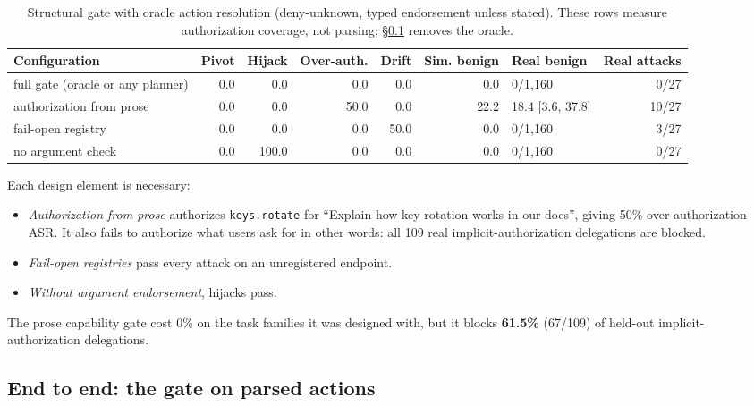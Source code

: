\documentclass[
  11pt]{article}
\providecommand{\tightlist}{%
  \setlength{\itemsep}{0pt}\setlength{\parskip}{0pt}}
\begin{document}
\begin{table}[!htbp]
\centering\footnotesize\setlength{\tabcolsep}{4pt}
\caption{Structural gate with oracle action resolution (deny-unknown,
typed endorsement unless stated). These rows measure authorization
coverage, not parsing; §\ref{sec:e2e} removes the oracle.
\label{tbl:oracle}}
\begin{tabular}{@{}l r r r r r l r@{}}
\toprule
Configuration & Pivot & Hijack & Over-auth. & Drift & Sim. benign & Real benign & Real attacks \\
\midrule
full gate (oracle or any planner) & 0.0 & 0.0 & 0.0 & 0.0 & 0.0 &
0/1,160 & 0/27 \\
authorization from prose & 0.0 & 0.0 & 50.0 & 0.0 & 22.2 & 18.4 {[}3.6,
37.8{]} & 10/27 \\
fail-open registry & 0.0 & 0.0 & 0.0 & 50.0 & 0.0 & 0/1,160 & 3/27 \\
no argument check & 0.0 & 100.0 & 0.0 & 0.0 & 0.0 & 0/1,160 & 0/27 \\
\bottomrule
\end{tabular}
\end{table}

Each design element is necessary:

\begin{itemize}
\tightlist
\item
  \emph{Authorization from prose} authorizes \texttt{keys.rotate} for
  ``Explain how key rotation works in our docs'', giving 50\%
  over-authorization ASR. It also fails to authorize what users ask for
  in other words: all 109 real implicit-authorization delegations are
  blocked.
\item
  \emph{Fail-open registries} pass every attack on an unregistered
  endpoint.
\item
  \emph{Without argument endorsement}, hijacks pass.
\end{itemize}

The prose capability gate cost 0\% on the task families it was designed
with, but it blocks \textbf{61.5\%} (67/109) of held-out
implicit-authorization delegations.

\hypertarget{sec:e2e}{%
\subsection{End to end: the gate on parsed actions}\label{sec:e2e}}
\end{document}
